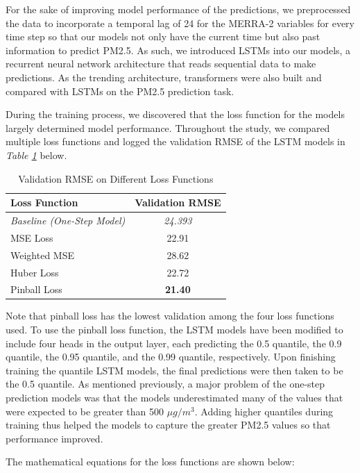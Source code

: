\documentclass[draft]{agujournal2019}
\begin{document}
For the sake of improving model performance of the predictions, we preprocessed the data to incorporate a temporal lag of 24 for the MERRA-2 variables for every time step so that our models not only have the current time but also past information to predict PM2.5. As such, we introduced LSTMs into our models, a recurrent neural network architecture that reads sequential data to make predictions. As the trending architecture, transformers were also built and compared with LSTMs on the PM2.5 prediction task.

During the training process, we discovered that the loss function for the models largely determined model performance. Throughout the study, we compared multiple loss functions and logged the validation RMSE of the LSTM models in \textit{Table \ref{tab:loss_fn}} below.

\begin{table}[htbp]
    \centering
    \begin{tabular}{l c}
        \toprule
        \textbf{Loss Function} & \textbf{Validation RMSE} \\
        \midrule
        \textit{Baseline (One-Step Model)} & \textit{24.393} \\
        MSE Loss & 22.91 \\
        Weighted MSE & 28.62 \\
        Huber Loss & 22.72 \\
        Pinball Loss & \textbf{21.40} \\
        \bottomrule
    \end{tabular}
    \caption{Validation RMSE on Different Loss Functions}
    \label{tab:loss_fn}
\end{table}

Note that pinball loss has the lowest validation among the four loss functions used. To use the pinball loss function, the LSTM models have been modified to include four heads in the output layer, each predicting the 0.5 quantile, the 0.9 quantile, the 0.95 quantile, and the 0.99 quantile, respectively. Upon finishing training the quantile LSTM models, the final predictions were then taken to be the 0.5 quantile. As mentioned previously, a major problem of the one-step prediction models was that the models underestimated many of the values that were expected to be greater than 500 \( \mu g/m^3 \). Adding higher quantiles during training thus helped the models to capture the greater PM2.5 values so that performance improved.

The mathematical equations for the loss functions are shown below:
\end{document}
